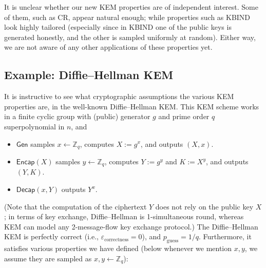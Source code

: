 \documentclass{article}
\theoremstyle{plain}
\theoremstyle{definition}
\theoremstyle{remark}
\newcommand{\Gen}{\mathsf{Gen}}
\newcommand{\Encap}{\mathsf{Encap}}
\newcommand{\Decap}{\mathsf{Decap}}
\begin{document}
\medskip
It is unclear whether our new KEM properties are of independent interest. Some of them, such as CR, appear natural enough; while properties such as KBIND look highly tailored (especially since in KBIND one of the public keys is generated honestly, and the other is sampled uniformly at random). Either way, we are not aware of any other applications of these properties yet.

\subsection{Example: Diffie--Hellman KEM}
\label{sec:dh-kem}
It is instructive to see what cryptographic assumptions the various KEM properties are, in the well-known Diffie--Hellman KEM. This KEM scheme works in a finite cyclic group with (public) generator $g$ and prime order $q$ superpolynomial in $n$, and
\begin{itemize}
  \item $\Gen$ samples $x \gets \mathbb{Z}_q$, computes $X := g^x$, and outputs $(X,x)$.
  \item $\Encap(X)$ samples $y \gets \mathbb{Z}_q$, computes $Y := g^y$ and $K := X^y$, and outputs $(Y,K)$.
  \item $\Decap(x,Y)$ outputs $Y^x$.
\end{itemize}
(Note that the computation of the ciphertext $Y$ does not rely on the public key $X$; in terms of key exchange, Diffie--Hellman is 1-simultaneous round, whereas KEM can model any 2-message-flow key exchange protocol.) The Diffie--Hellman KEM is perfectly correct (i.e., $\varepsilon_\text{correctness} = 0$), and $p_\text{guess} = 1/q$. Furthermore, it satisfies various properties we have defined (below whenever we mention $x,y$, we assume they are sampled as $x,y \gets \mathbb{Z}_q$):
\end{document}
